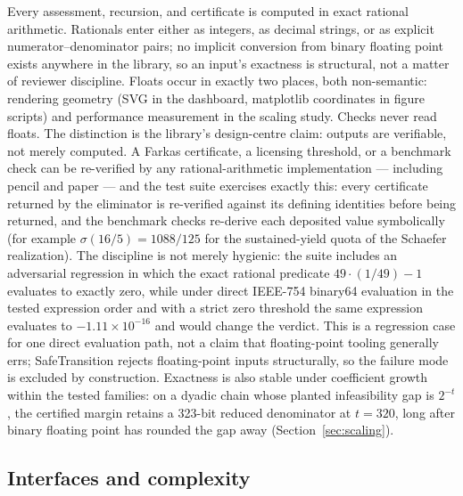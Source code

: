 \documentclass[11pt]{article}
\begin{document}
Every assessment, recursion, and certificate is computed in exact rational
arithmetic. Rationals enter either as integers, as decimal strings, or as
explicit numerator--denominator pairs; no implicit conversion from binary
floating point exists anywhere in the library, so an input's exactness is
structural, not a matter of reviewer discipline. Floats occur in exactly two
places, both non-semantic: rendering geometry (SVG in the dashboard,
matplotlib coordinates in figure scripts) and performance measurement in
the scaling study. Checks never read floats. The distinction is
the library's design-centre claim: outputs are verifiable, not merely
computed. A Farkas certificate, a licensing threshold, or a benchmark check
can be re-verified by any rational-arithmetic implementation --- including
pencil and paper --- and the test suite exercises exactly this: every
certificate returned by the eliminator is re-verified against its defining
identities before being returned, and the benchmark checks re-derive each
deposited value symbolically (for example $\sigma(16/5) = 1088/125$ for the
sustained-yield quota of the Schaefer realization). The discipline is not
merely hygienic: the suite includes an adversarial regression in which
the exact rational predicate $49 \cdot (1/49) - 1$ evaluates to exactly
zero, while under direct IEEE-754 binary64 evaluation in the tested
expression order and with a strict zero threshold the same expression
evaluates to $-1.11 \times 10^{-16}$ and would change the verdict. This
is a regression case for one direct evaluation path, not a claim that
floating-point tooling generally errs; SafeTransition rejects
floating-point inputs structurally, so the failure mode is excluded by
construction. Exactness is also stable under coefficient growth within
the tested families: on a dyadic chain whose planted infeasibility gap is
$2^{-t}$, the certified margin retains a 323-bit reduced denominator at
$t = 320$, long after binary floating point has rounded the gap away
(Section~\ref{sec:scaling}).

\subsection{Interfaces and complexity}\label{sec:api}
\end{document}
